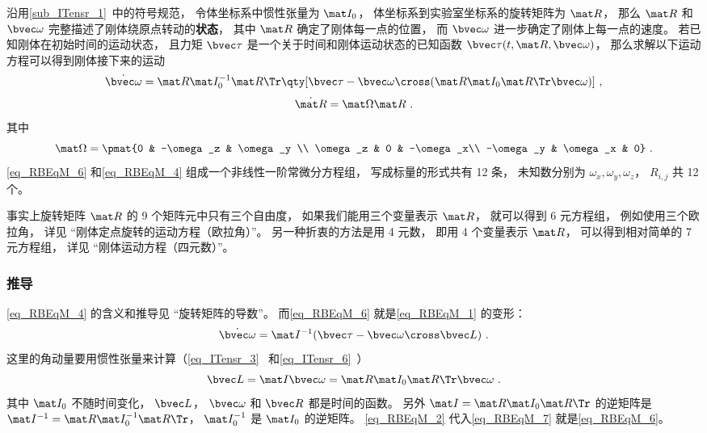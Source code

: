 沿用\autoref{sub_ITensr_1}~中的符号规范， 令体坐标系中惯性张量为 $\mat I_0$， 体坐标系到实验室坐标系的旋转矩阵为 $\mat R$， 那么 $\mat R$ 和 $\bvec \omega$ 完整描述了刚体绕原点转动的\textbf{状态}， 其中 $\mat R$ 确定了刚体每一点的位置， 而 $\bvec \omega$ 进一步确定了刚体上每一点的速度。 若已知刚体在初始时间的运动状态， 且力矩 $\bvec \tau$ 是一个关于时间和刚体运动状态的已知函数 $\bvec \tau(t, \mat R, \bvec\omega)$， 那么求解以下运动方程可以得到刚体接下来的运动
\begin{equation}\label{eq_RBEqM_6}
\dot{\bvec \omega} = \mat R \mat I_0^{-1} \mat R\Tr \qty[\bvec \tau  - \bvec\omega\cross(\mat R \mat I_0 \mat R\Tr \bvec\omega)]~,
\end{equation}
\begin{equation}\label{eq_RBEqM_4}
\dot{\mat R} = \mat\Omega \mat R~.
\end{equation}
其中
\begin{equation}\label{eq_RBEqM_5}
\mat\Omega = \pmat{0 & -\omega_z & \omega_y \\ \omega_z & 0 & -\omega_x\\ -\omega_y & \omega_x & 0}~.
\end{equation}
\autoref{eq_RBEqM_6} 和\autoref{eq_RBEqM_4} 组成一个非线性一阶常微分方程组， 写成标量的形式共有 12 条， 未知数分别为 $\omega_x, \omega_y, \omega_z$， $R_{i,j}$ 共 12 个。

事实上旋转矩阵 $\mat R$ 的 9 个矩阵元中只有三个自由度， 如果我们能用三个变量表示 $\mat R$， 就可以得到 6 元方程组， 例如使用三个欧拉角， 详见 “刚体定点旋转的运动方程（欧拉角）”。 另一种折衷的方法是用 4 元数， 即用 4 个变量表示 $\mat R$， 可以得到相对简单的 7 元方程组， 详见 “刚体运动方程（四元数）”。

\subsubsection{推导}

\autoref{eq_RBEqM_4} 的含义和推导见 “旋转矩阵的导数”。 而\autoref{eq_RBEqM_6} 就是\autoref{eq_RBEqM_1} 的变形：
\begin{equation}\label{eq_RBEqM_7}
\dot{\bvec \omega} = \mat I^{-1} (\bvec\tau - \bvec\omega\cross\bvec L)~.
\end{equation}
这里的角动量要用惯性张量来计算（\autoref{eq_ITensr_3}~ 和\autoref{eq_ITensr_6}~）
\begin{equation}\label{eq_RBEqM_2}
\bvec L = \mat I \bvec \omega = \mat R \mat I_0 \mat R\Tr \bvec \omega~.
\end{equation}
其中 $\mat I_0$ 不随时间变化， $\bvec L$， $\bvec \omega$ 和 $\bvec R$ 都是时间的函数。 另外 $\mat I = \mat R \mat I_0 \mat R\Tr$ 的逆矩阵是 $\mat I^{-1} = \mat R \mat I_0^{-1} \mat R\Tr$， $\mat I_0^{-1}$ 是 $\mat I_0$ 的逆矩阵。 \autoref{eq_RBEqM_2} 代入\autoref{eq_RBEqM_7} 就是\autoref{eq_RBEqM_6}。

